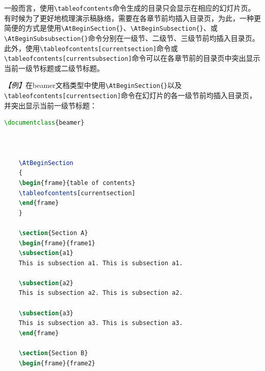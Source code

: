 一般而言，使用\texttt{\textbackslash{}tableofcontents}命令生成的目录只会显示在相应的幻灯片页。有时候为了更好地梳理演示稿脉络，需要在各章节前均插入目录页，为此，一种更简便的方式是使用\texttt{\textbackslash{}AtBeginSection\{\}}、\texttt{\textbackslash{}AtBeginSubsection\{\}}、或\texttt{\textbackslash{}AtBeginSubsubsection\{\}}命令分别在一级节、二级节、三级节前均插入目录页。此外，使用\texttt{\textbackslash{}tableofcontents[currentsection]}命令或\texttt{\textbackslash{}tableofcontents[currentsubsection]}命令可以在各章节前的目录页中突出显示当前一级节标题或二级节标题。

\emph{【例】}在beamer文档类型中使用\texttt{\textbackslash{}AtBeginSection\{\}}以及\texttt{\textbackslash{}tableofcontents[currentsection]}命令在幻灯片的各一级节前均插入目录页，并突出显示当前一级节标题：
\begin{lstlisting}[language=TeX]
    \documentclass{beamer}

    

    \AtBeginSection
    {
    \begin{frame}{table of contents}
    \tableofcontents[currentsection]
    \end{frame}
    }

    \section{Section A}
    \begin{frame}{frame1}
    \subsection{a1}
    This is subsection a1. This is subsection a1.

    \subsection{a2}
    This is subsection a2. This is subsection a2.

    \subsection{a3}
    This is subsection a3. This is subsection a3.
    \end{frame}

    \section{Section B}
    \begin{frame}{frame2}

\end{lstlisting}
